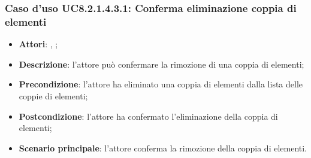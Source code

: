 		\subsubsection{Caso d'uso UC8.2.1.4.3.1: Conferma eliminazione coppia di elementi}
		\label{UC8.2.1.4.3.1}
		\begin{itemize}
			\item \textbf{Attori}: \uau, \uaupro;
			\item \textbf{Descrizione}: l'attore può confermare la rimozione di una coppia di elementi;
			\item \textbf{Precondizione}: l'attore ha eliminato una coppia di elementi dalla lista delle coppie di elementi;
			\item \textbf{Postcondizione}: l'attore ha confermato l'eliminazione della coppia di elementi;
			\item \textbf{Scenario principale}: l'attore conferma la rimozione della coppia di elementi.
		\end{itemize}

